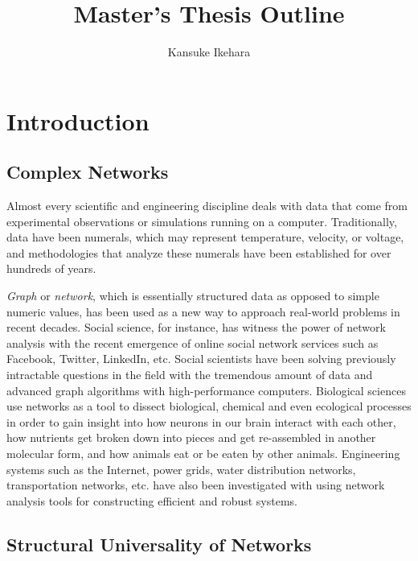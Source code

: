 \documentclass{article}
\begin{document}
\title{Master's Thesis Outline}
\author{Kansuke Ikehara}
\maketitle

\begin{abstract}
\end{abstract}
\tableofcontents


\section{Introduction}
	\subsection{Complex Networks}
	Almost every scientific and engineering discipline deals with data that come from experimental observations or simulations running on a computer. Traditionally, data have been numerals, which may represent temperature, velocity, or voltage, and methodologies that analyze these numerals have been established for over hundreds of years. 
	
	\textit{Graph} or \textit{network}, which is essentially structured data as opposed to simple numeric values, has been used as a new way to approach real-world problems in  recent decades. Social science, for instance, has witness the power of network analysis with the recent emergence of online social network services such as Facebook, Twitter, LinkedIn, etc.  Social scientists have been solving previously intractable questions in the field with the tremendous amount of  data and advanced graph algorithms with high-performance computers. Biological sciences use networks as a tool to dissect biological, chemical and even ecological processes in order to gain insight into how neurons in our brain interact with each other, how nutrients get broken down into pieces and get re-assembled in another molecular form, and how animals eat or be eaten by other animals. Engineering systems such as the Internet, power grids, water distribution networks, transportation networks, etc. have also been investigated with using network analysis tools for constructing efficient and robust systems. 
	
	
	\subsection{Structural Universality of Networks}
	
\end{document}

